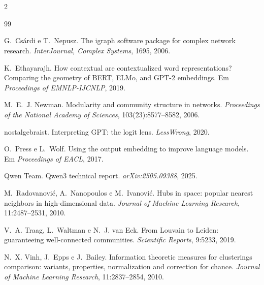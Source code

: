 \documentclass[11pt,a4paper]{article}
\begin{document}
\section*{\refname}
\begin{multicols}{2}
\begin{thebibliography}{99}
\footnotesize
\setlength{\itemsep}{1pt}

G.~Csárdi e T.~Nepusz.
The igraph software package for complex network research.
\emph{InterJournal, Complex Systems}, 1695, 2006.

K.~Ethayarajh.
How contextual are contextualized word representations? Comparing the geometry of BERT,
ELMo, and GPT-2 embeddings.
Em \emph{Proceedings of EMNLP-IJCNLP}, 2019.

M.~E.~J. Newman.
Modularity and community structure in networks.
\emph{Proceedings of the National Academy of Sciences}, 103(23):8577--8582, 2006.

nostalgebraist.
Interpreting GPT: the logit lens.
\emph{LessWrong}, 2020.

O.~Press e L.~Wolf.
Using the output embedding to improve language models.
Em \emph{Proceedings of EACL}, 2017.

Qwen Team.
Qwen3 technical report.
\emph{arXiv:2505.09388}, 2025.

M.~Radovanović, A.~Nanopoulos e M.~Ivanović.
Hubs in space: popular nearest neighbors in high-dimensional data.
\emph{Journal of Machine Learning Research}, 11:2487--2531, 2010.

V.~A. Traag, L.~Waltman e N.~J. van Eck.
From Louvain to Leiden: guaranteeing well-connected communities.
\emph{Scientific Reports}, 9:5233, 2019.

N.~X. Vinh, J.~Epps e J.~Bailey.
Information theoretic measures for clusterings comparison: variants, properties,
normalization and correction for chance.
\emph{Journal of Machine Learning Research}, 11:2837--2854, 2010.

\end{thebibliography}
\end{multicols}
\end{document}
